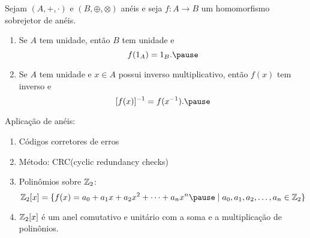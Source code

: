 \documentclass{beamer}
\begin{document}
    \begin{frame}
        \begin{proposicao}
            Sejam $(A, +, \cdot)$ e $(B, \oplus, \otimes)$ anéis \pause e seja $f : A \to B$ um homomorfismo sobrejetor de anéis.\pause
            \begin{enumerate}[label={\roman*})]
                \item Se $A$ tem unidade, \pause então $B$ tem unidade e\pause
                \[
                    f(1_A) = 1_B.\pause
                \]

                \vspace{.5cm}

                \item Se $A$ tem unidade \pause e $x \in A$ \pause possui inverso multiplicativo, \pause então $f(x)$ \pause tem inverso e\pause
                \[
                    [f(x)]^{-1} = f(x^{-1}).\pause
                \]

                \vspace{.5cm}
            \end{enumerate}
        \end{proposicao}
    \end{frame}

    \begin{frame}
        Aplicação de anéis:
        \begin{enumerate}[label={\arabic*})]
            \item Códigos corretores de erros\pause

            \item Método: CRC(cyclic redundancy checks)\pause

            \item Polinômios sobre $\mathbb{Z}_2$:\pause
                \[\z_2[x] = \{f(x) = a_0 + a_1x + a_2x^2 + \cdots + a_nx^n \pause \mid a_0, a_1, a_2, \dots, a_n \in \z_2\}\]\pause
            \item $\mathbb{Z}_2[x]$ é um anel comutativo e unitário com a soma e a multiplicação de polinônios.\pause

            \seti
        \end{enumerate}
    \end{frame}
\end{document}
